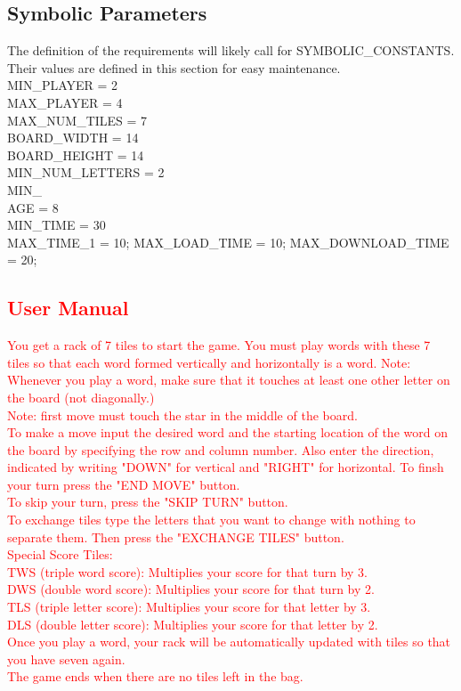 \documentclass[12pt, titlepage]{article}
\begin{document}
\subsection{Symbolic Parameters}

The definition of the requirements will likely call for SYMBOLIC\_CONSTANTS.
Their values are defined in this section for easy maintenance. \\
MIN\_PLAYER = 2 \\
MAX\_PLAYER = 4 \\
MAX\_NUM\_TILES =  7 \\
BOARD\_WIDTH = 14 \\
BOARD\_HEIGHT = 14 \\
MIN\_NUM\_LETTERS = 2 \\
MIN\_\\AGE = 8\\
MIN\_TIME = 30 \\
MAX\_TIME\_1 = 10;
MAX\_LOAD\_TIME = 10;
MAX\_DOWNLOAD\_TIME = 20;
\textcolor{red}{\subsection{\textcolor{red}{User Manual}}}
\textcolor{red}{You get a rack of 7 tiles to start the game. You must            play words with these 7 tiles so that each word formed vertically         and horizontally is a word. 
        Note: Whenever you play a word, make sure that it touches at least one other letter on the board (not diagonally.)\\
        Note: first move must touch the star in the middle of the board.\\
        To make a move input the desired word and the starting location of the word on the board by specifying the row and column number. Also enter the direction, indicated by writing "DOWN" for vertical and "RIGHT" for horizontal. To finsh your turn press the "END MOVE" button. \\
        To skip your turn, press the "SKIP TURN" button. \\
        To exchange tiles type the letters that you want to change with nothing to separate them. Then press the "EXCHANGE TILES" button.\\ 
        Special Score Tiles:\\ 
        TWS (triple word score): Multiplies your score for that turn by 3.\\ 
        DWS (double word score): Multiplies your score for that turn by 2. \\
        TLS (triple letter score): Multiplies your score for that letter by 3. \\
        DLS (double letter score): Multiplies your score for that letter by 2.\\
        Once you play a word, your rack will be automatically updated with tiles so that you have seven again. \\
        The game ends when there are no tiles left in the bag.}
\end{document}
